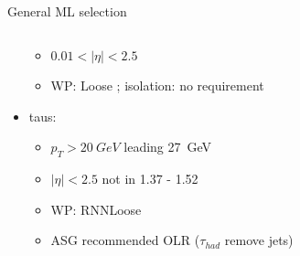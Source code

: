 \documentclass[10pt, UKenglish]{beamer}
\begin{document}
\begin{frame}{General ML selection}
\begin{columns}
\begin{column}{0.7\textwidth}
\begin{itemize}
\begin{itemize}
            \item $0.01<|\eta|<2.5$
            \item WP: Loose ; isolation: no requirement
          \end{itemize}
          \item taus:
          \vspace*{-0.02\textwidth}
          \begin{itemize}
            \footnotesize
            \item $p_T>\SI{20}{GeV}$ leading \SI{27}{GeV}
            \item $|\eta|<2.5$ not in 1.37 - 1.52
            \item WP: RNNLoose
            \item ASG recommended OLR ($\tau_{had}$ remove jets)
          \end{itemize}
        \end{itemize}
      \end{column}
    \end{columns}
  \end{frame}
%
%
\end{document}
